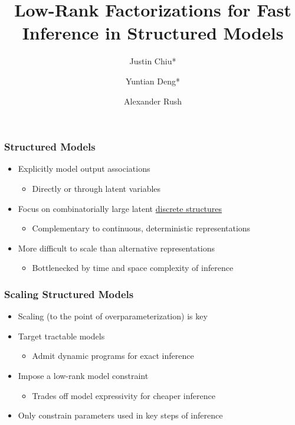 \documentclass{beamer}
\title{Low-Rank Factorizations for Fast Inference in Structured Models}
\author{Justin Chiu* \inst{1} \and Yuntian Deng* \inst{2} \and Alexander Rush \inst{1}}
\institute[shortinst]{\inst{1} Cornell Tech \and \inst{2} Harvard University}
\begin{document}
\begin{frame}[plain]
\titlepage
\end{frame}

\begin{frame}
\frametitle{Structured Models}
\begin{itemize}
\item Explicitly model output associations
    \begin{itemize}
    \item Directly or through latent variables
    \end{itemize}
\vspace{1em}
\item Focus on combinatorially large latent \underline{discrete structures}
    \begin{itemize}
    \item Complementary to continuous, deterministic representations
    \end{itemize}
\vspace{1em}
\item More difficult to scale than alternative representations
\begin{itemize}
    \item Bottlenecked by time and space complexity of inference
    \end{itemize}
\end{itemize}
\end{frame}

\begin{frame}
\frametitle{Scaling Structured Models}

\begin{itemize}
\item Scaling (to the point of overparameterization) is key
\vspace{1em}
\item Target tractable models
    \begin{itemize}
    \item Admit dynamic programs for exact inference
    \end{itemize}
\vspace{1em}
\item Impose a low-rank model constraint
    \begin{itemize}
    \item Trades off model expressivity for cheaper inference
    \end{itemize}
\vspace{1em}
\item Only constrain parameters used in key steps of inference
\end{itemize}
\end{frame}
\end{document}
